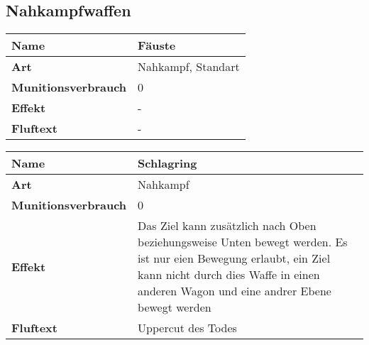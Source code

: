 \subsection{Nahkampfwaffen}


\begin{table}[H]
  \begin{center}
    \label{tab:table1}
    \begin{tabular}{|l|p{8cm}|}
      \hline
      \textbf{Name} & Fäuste \\
      \hline
      \textbf{Art} & Nahkampf, Standart \\
      \hline
      \textbf{Munitionsverbrauch} & 0 \\
      \hline
      \textbf{Effekt} & - \\
      \hline
      \textbf{Fluftext} & - \\
      \hline
    \end{tabular}
  \end{center}
\end{table}


\begin{table}[H]
  \begin{center}
    \label{tab:table1}
    \begin{tabular}{|l|p{8cm}|}
      \hline
      \textbf{Name} & Schlagring \\
      \hline
      \textbf{Art} & Nahkampf \\
      \hline
      \textbf{Munitionsverbrauch} & 0 \\
      \hline
      \textbf{Effekt} & Das Ziel kann zusätzlich nach Oben beziehungsweise Unten bewegt werden. Es ist nur
                        eien Bewegung erlaubt, ein Ziel kann nicht durch dies Waffe in einen anderen Wagon
                        und eine andrer Ebene bewegt werden \\
      \hline
      \textbf{Fluftext} & Uppercut des Todes \\
      \hline
    \end{tabular}
  \end{center}
\end{table}


